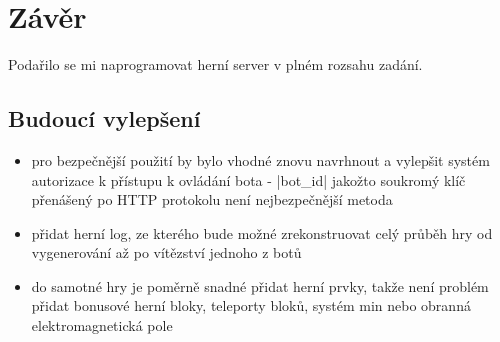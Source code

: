 
\section{Závěr}

Podařilo se mi naprogramovat herní server v plném rozsahu zadání.

\subsection{Budoucí vylepšení}

\begin{itemize}
 \item pro bezpečnější použití by bylo vhodné znovu navrhnout a vylepšit systém autorizace k přístupu k ovládání bota - \ic|bot_id| jakožto soukromý klíč přenášený po HTTP protokolu není nejbezpečnější metoda
 \item přidat herní log, ze kterého bude možné zrekonstruovat celý průběh hry od vygenerování až po vítězství jednoho z botů  
 \item do samotné hry je poměrně snadné přidat herní prvky, takže není problém přidat bonusové herní bloky, teleporty bloků, systém min nebo obranná elektromagnetická pole
\end{itemize}

